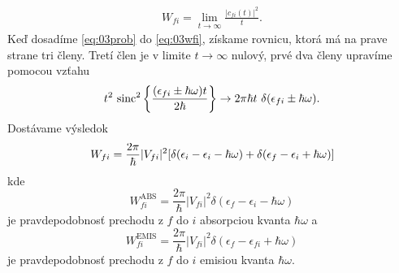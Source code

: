 \begin{align}
\label{eq:03wfi}
W_{fi}=\lim_{t\to \infty} \frac{|c_{fi}(t)|^2}{t} \text{.}
\end{align}
Keď dosadíme \eqref{eq:03prob} do  \eqref{eq:03wfi}, získame rovnicu, ktorá má na prave strane tri členy.
Tretí člen je v limite $t\to \infty$ nulový, prvé dva členy upravíme pomocou vzťahu
\begin{align}
t^{2}\ \mathrm{sinc}^{2}\left\lbrace\frac{(\epsilon_{fi}\pm \hbar\omega)t}{2\hbar}\right\rbrace
\to
2\pi\hbar t \ \delta(\epsilon_{fi}\pm \hbar\omega)
\text{.}
\end{align}
Dostávame výsledok
\begin{equation}
W_{fi}=
\frac{2\pi}{\hbar}|V_{fi}|^2[\delta(\epsilon_{i}-\epsilon_{i}-\hbar\omega)
+\delta(\epsilon_{f}-\epsilon_{i}+\hbar\omega)]\\
\end{equation}
kde
\begin{equation}
W_{fi}^{\mathrm{ABS}} =\frac{2\pi}{\hbar}|V_{fi}|^2\delta(\epsilon_{f}-\epsilon_{i}-\hbar\omega)
\end{equation}
je pravdepodobnosť prechodu z $f$ do $i$ absorpciou kvanta $\hbar\omega$ a
\begin{equation}
W_{fi}^{\mathrm{EMIS}}=\frac{2\pi}{\hbar}|V_{fi}|^2\delta(\epsilon_{f}-\epsilon_{fi}+\hbar\omega)\text{}
\end{equation}
je pravdepodobnosť prechodu z $f$ do $i$ emisiou kvanta $\hbar\omega$.

